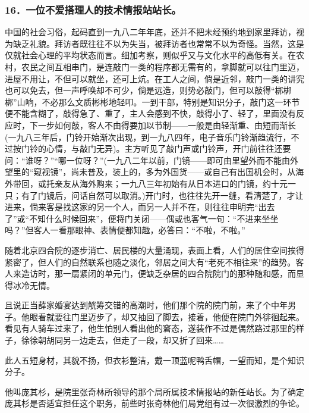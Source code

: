 \subsubsection*{16．一位不爱搭理人的技术情报站站长。}
\par 中国的社会习俗，起码直到一九八二年年底，还并不把未经预约地到家里拜访，视为缺乏礼貌。拜访者既往往不以为失当，被拜访者也常常不以为奇怪。当然，这是仅就社会心理的平均状态而言。细加考察，则似乎又与文化水平的高低有关。在农村，农民之间互相串门，是连敲门一类的程序都无需有的，拿脚就可以往门里迈，进屋不用让，不但可以就坐，还可上炕。在工人之间，倘是近邻，敲门一类的讲究也可以免去，但一声呼唤却不可少，倘是远造，则势必敲门，但可以敲得“梆梆梆”山响，不必那么文质彬彬地轻叩。一到干部，特别是知识分子，敲门这一环节便不能含糊了，敲得急了、重了，主人会感到不快，敲得小了、轻了，里面没有反应时，下一步如何敲，客人不由得要加以节制——一般是由轻渐重、由短而渐长(一九八三年后，门铃开始渐次出现，到一九八四年，电子音乐门铃渐趋流行，不过按门铃的心情，与敲门无异)。主方听见了敲门声或门铃声，开门前往往还要问：“谁呀？”“哪一位呀？”(一九八二年以前，门镜——即可由里望外而不能由外望里的“窥视镜”，尚未普及，装上的，多为外国货——或自己有出国机会时，从海外带回，或托亲友从海外购来；一九八三年初始有从日本进口的门镜，约十元一只；有了门镜后，问话自然可以取消。)开门时，也往往先开一缝，看清楚了，才让进来，倘来客是找这家的另一个人，而另一人并不在，则往往申明完“出去了”或“不知什么时候回来”，便将门关闭——偶或也客气一句：“不进来坐坐吗？”但客人一看那眼神、表情便都知趣，必答曰：“不啦，不啦。”
\par 随着北京四合院的逐步消亡、居民楼的大量涌现，表面上看，人们的居住空间挨得紧密了，但人们的自然联系也随之淡化，邻居之间大有“老死不相往来”的趋势。客人来造访时，那一扇紧闭的单元门，便缺乏杂居的四合院院门的那种随和感，而显得冰冷无情。
\par 且说正当薛家婚宴达到觥筹交错的高潮时，他们那个院的院门前，来了个中年男子。他眼看就要往门里迈步了，却又抽回了脚去，接着，他便在院门外徘徊起来。看见有人骑车过来了，他生怕别人看出他的窘态，遂装作不过是偶然路过那里的样子，徐徐朝胡同另一边走去，但走了一段，却又折了回来……
\par 此人五短身材，其貌不扬，但衣衫整洁，戴一顶蓝呢鸭舌帽，一望而知，是个知识分子。
\par 他叫庞其杉，是院里张奇林所领导的那个局所属技术情报站的新任站长。为了确定庞其杉是否适宜担任这个职务，前些时张奇林他们局党组有过一次很激烈的争论。

